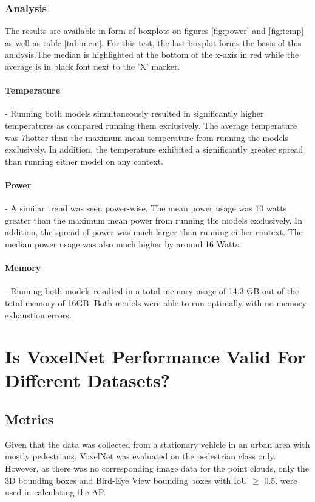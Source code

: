 \subsubsection*{Analysis}
The results are available in form of boxplots on figures \ref{fig:power} and \ref{fig:temp} as well as table \ref{tab:mem}. For this test, the last boxplot forms the basis of this analysis.The median is highlighted at the bottom of the x-axis in red while the average is in black font next to the 'X' marker.
\paragraph{Temperature} - Running both models simultaneously resulted in significantly higher temperatures as compared running them exclusively. The average temperature was 7\degree hotter than the maximum mean temperature from running the models exclusively. In addition, the temperature exhibited a significantly greater spread than running either model on any context.
\paragraph{Power} - A similar trend was seen power-wise. The mean power usage was 10 watts greater than the maximum mean power from running the models exclusively. In addition, the spread of power was much larger than running either context. The median power usage was also much higher by around 16 Watts. 
\paragraph{Memory} - Running both models resulted in a total memory usage of 14.3 GB out of the total memory of 16GB. Both models were able to run optimally with no memory exhaustion errors. 

\section{Is VoxelNet Performance Valid For Different Datasets?}
\subsection*{Metrics}
Given that the data was collected from a stationary vehicle in an urban area with mostly pedestrians,  VoxelNet was evaluated on the pedestrian class only. However, as there was no corresponding image data for the point clouds, only the 3D bounding boxes and Bird-Eye View bounding boxes with IoU $\geq$ 0.5. were used in calculating the AP. 

